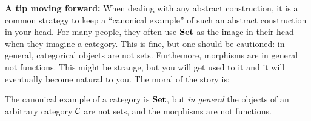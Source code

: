     \textbf{A tip moving forward:} When dealing with any abstract construction, it is a common 
    strategy to keep a ``canonical example'' of such an abstract construction in your head. 
    For many people, they often use $\operatorname{\mathbf{Set}}$ as the image in their head when they imagine a category. 
    This is fine, but one should be cautioned: 
    in general, categorical objects are not sets. 
    Furthemore, morphisms are in general not functions.
    This might be strange, but you will get used to it and it will eventually become natural to you.
    The moral of the story is:
    \begin{center}
        \begin{minipage}{0.7\textwidth}
            \textcolor{NavyBlue}{The canonical example of a category is $\operatorname{\mathbf{Set}}$, but 
            \emph{in general} the objects of an arbitrary category $\mathcal{C}$ are not sets, 
            and the morphisms are not functions. }
        \end{minipage}
    \end{center}

